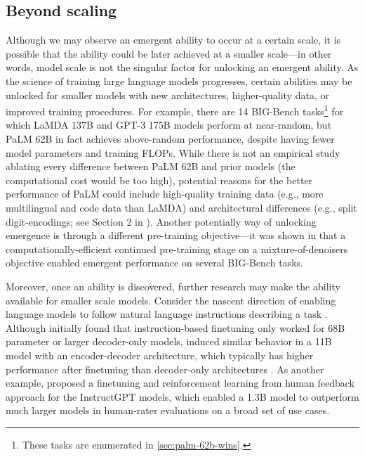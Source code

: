 \documentclass[10pt]{article} %
\begin{document}
\subsection{Beyond scaling}\label{subsec:beyond-scaling}
Although we may observe an emergent ability to occur at a certain scale, it is possible that the ability could be later achieved at a smaller scale---in other words, model scale is not the singular factor for unlocking an emergent ability.
As the science of training large language models progresses, certain abilities may be unlocked for smaller models with new architectures, higher-quality data, or improved training procedures.
For example, there are 14 BIG-Bench tasks\footnote{These tasks are enumerated in \cref{sec:palm-62b-wins}.} for which LaMDA 137B and GPT-3 175B models perform at near-random, but PaLM 62B in fact achieves above-random performance, despite having fewer model parameters and training FLOPs.
While there is not an empirical study ablating every difference between PaLM 62B and prior models (the computational cost would be too high), potential reasons for the better performance of PaLM could include high-quality training data (e.g., more multilingual and code data than LaMDA) and architectural differences (e.g., split digit-encodings; see Section 2 in \citet{chowdhery2022palm}).
Another potentially way of unlocking emergence is through a different pre-training objective---it was shown in \citet{tay2022transcending} that a computationally-efficient continued pre-training stage on a mixture-of-denoisers objective \citep{tay2022unifying} enabled emergent performance on several BIG-Bench tasks.


Moreover, once an ability is discovered, further research may make the ability available for smaller scale models. %
Consider the nascent direction of enabling language models to follow natural language instructions describing a task \citep[][\textit{inter alia}]{wei2021finetuned,sanh2022multitask,ouyang2022training}.
Although \citet{wei2021finetuned} initially found that instruction-based finetuning only worked for 68B parameter or larger decoder-only models, \citet{sanh2022multitask} induced similar behavior in a 11B model with an encoder-decoder architecture, which typically has higher performance after finetuning than decoder-only architectures \citep{wang2022language}.
As another example, \citet{ouyang2022training} proposed a finetuning and reinforcement learning from human feedback approach for the InstructGPT models, which enabled a 1.3B model to outperform much larger models in human-rater evaluations on a broad set of use cases.
\end{document}
